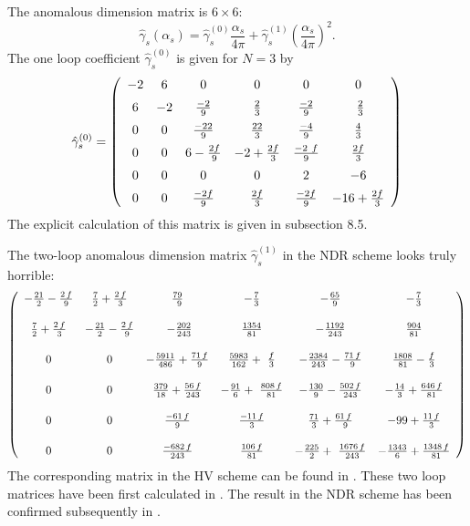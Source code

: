 \documentclass[12pt]{article}
\newcommand{\svs}{\vbox{\vskip 5mm}}
\newcommand{\mvs}{\vbox{\vskip 8mm}}
\def\as{\alpha_s}
\def\aspi{\frac{\as}{4\pi}}
\begin{document}
\begin{itemize}
\begin{itemize}
The anomalous dimension matrix is $6\times6$:
\begin{equation}
\hat\gamma_s(\as)=\hat\gamma_s^{(0)}\aspi + 
\hat\gamma_s^{(1)}\left(\aspi\right)^2.
\label{eq:gsexpKpp}
\end{equation}
The one loop coefficient $\hat \gamma_s^{(0)}$ is given for $N=3$  by
\cite{PENGUIN}
\begin{equation}
\hat \gamma^{(0)}_s = 
\left(
\begin{array}{cccccc}
{{-2}} & 6 & 0 & 0 & 0 & 0 \\ \svs
6 & {{-2}} & {{-2}\over {9}} & {2\over 3} & {{-2}\over {9}} &\
  {2\over 3} \\ \svs
0 & 0 & {{-22}\over {9}} & {{22}\over 3} & {{-4}\over {9}} & {4\over 3}
\\ \svs
0 & 0 & 6 - {{2 f}\over {9}} & {{-2}} + {{2 f}\over 3} & {{-2\
  f}\over {9}} & {{2 f}\over 3} \\ \svs
0 & 0 & 0 & 0 & {2} & -6  \\ \svs
0 & 0 & {{-2 f}\over {9}} & {{2 f}\over 3} & {{-2 f}\over {9}} & -16
   + {{2 f}\over 3}
\end{array}
\right)
\label{eq:gs0Kpp}
\end{equation}
The explicit calculation of this matrix is given in subsection 8.5.

The two-loop anomalous dimension matrix $\hat \gamma^{(1)}_s$ in the
NDR scheme looks truly  horrible:
\begin{equation}
\left(
\begin{array}{cccccc}
-{{21}\over 2} - {{2\,f}\over 9} & {7\over 2} + {{2\,f}\over 3} & {{79}\over\
  9} & -{7\over 3} & -{{65}\over 9} & -{{7}\over{3}} \\ \mvs
{7\over 2} + {{2\,f}\over 3} & -{{21}\over 2} - {{2\,f}\over 9} &\
  -{{202}\over {243}} & {{1354}\over {81}} & -{{1192}\over {243}} &
{904 \over 81} \\ \mvs
0 & 0 & -{{5911}\over {486}} + {{71\,f}\over 9} & {{5983}\over {162}} +\
  {f\over 3} & -{{2384}\over {243}} - {{71\,f}\over 9} &
{1808 \over 81} - {f \over 3} \\ \mvs
0 & 0 & {{379}\over {18}} + {{56\,f}\over {243}} & -{{91}\over 6} +\
  {{808\,f}\over {81}} & -{{130}\over 9} - {{502\,f}\over {243}} &
-{14 \over 3} + {{646\,f} \over 81} \\ \mvs
0 & 0 & {{-61\,f}\over 9} & {{-11\,f}\over 3} & {{71}\over 3} + {{61\,f}\over\
  9} & -99 + {{11\,f} \over 3} \\ \mvs
0 & 0 & {{-682\,f}\over {243}} & {{106\,f}\over {81}} & -{{225}\over 2} +\
  {{1676\,f}\over {243}} & -{1343 \over 6} + {{1348\,f} \over 81}
\end{array}
\right)
\label{eq:gs1ndrN3Kpp}
\end{equation}
The corresponding matrix in the HV scheme can be found in \cite{BJLW1}.
These two loop matrices have been first calculated in
\cite{BJLW1,ROMA1,ROMA2}. The result in the NDR scheme has been confirmed
subsequently in \cite{CZMM}.


\end{itemize}
\end{itemize}
\end{document}
